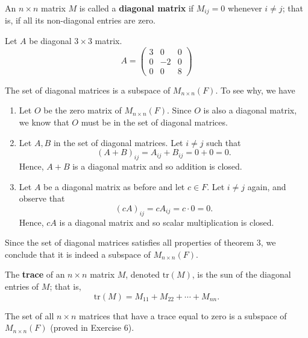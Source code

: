 \begin{definition}
    An \( n \times n  \) matrix \( M  \) is called a \textbf{diagonal matrix} if \( M_{ij} = 0  \) whenever \( i \neq j  \); that is, if all its non-diagonal entries are zero.
\end{definition}

\begin{eg}
    Let \( A  \) be diagonal \(  3 \times 3  \) matrix.
    \[  A = \begin{pmatrix}
        3 & 0 & 0 \\
        0 & -2 & 0 \\
        0 & 0 & 8
    \end{pmatrix} \]
\end{eg}

\begin{eg}
    The set of diagonal matrices is a subspace of \( M_{n \times n}(F)  \). To see why, we have 
    \begin{enumerate}
        \item Let \( O  \) be the zero matrix of \( M_{n \times n }(F) \). Since \( O  \) is also a diagonal matrix, we know that \( O  \) must be in the set of diagonal matrices.
        \item Let \( A, B  \) in the set of diagonal matrices. Let \( i \neq j  \) such that 
            \[  (A +  B)_{ij} =  A_{ij} + B_{ij} = 0 + 0 = 0.  \]
            Hence, \( A + B   \) is a diagonal matrix and so addition is closed.
        \item Let \( A  \) be a diagonal matrix as before and let \( c \in F   \). Let \( i \neq j  \) again, and observe that 
            \[  (cA)_{ij} = cA_{ij} = c \cdot 0 = 0.   \]
            Hence, \( cA   \) is a diagonal matrix and so scalar multiplication is closed.
    \end{enumerate}
    Since the set of diagonal matrices satisfies all properties of theorem 3, we conclude that it is indeed a subspace of \( M_{n \times n }(F) \).
\end{eg}

\begin{definition}[Trace]
    The \textbf{trace} of an \( n \times n  \) matrix \( M  \), denoted \( \text{tr}(M) \), is the sun of the diagonal entries of \( M  \); that is,
    \[  \text{tr}(M) = M_{11} + M_{22} + \cdots + M_{n n }. \]
\end{definition}

The set of all \( n \times n  \) matrices that have a trace equal to zero is a subspace of \( M_{n \times n}(F)  \) (proved in Exercise 6).


